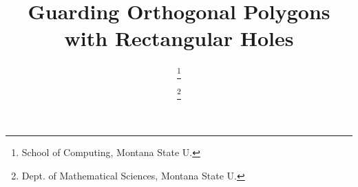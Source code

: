 \documentclass[11pt]{article}
\title{\vspace{-5ex}Guarding Orthogonal Polygons with Rectangular Holes}
\date{\vspace{-5ex}}
\author{\todo{Authors} \thanks{School of Computing, Montana State U.
} \and \todo{} \thanks{Dept. of Mathematical
    Sciences, Montana State U.     \newline {\scriptsize {\todo{emails}} }} \and
    \todo{author}\footnotemark[2] }
\begin{document}
\thispagestyle{empty}
\maketitle

\begin{abstract}
%
\end{abstract}

{}

\small{


}
\end{document}
